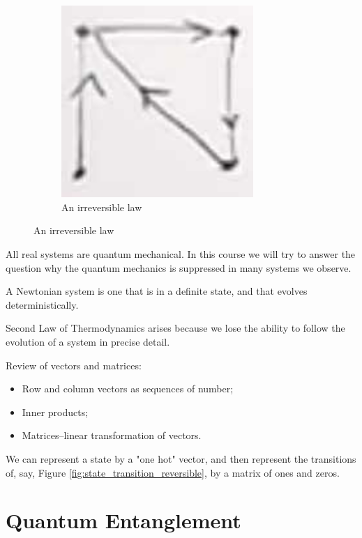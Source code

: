 \documentclass[]{article}
\begin{document}
\begin{figure}[H]
\begin{subfigure}[t]{0.45\textwidth}
	\end{subfigure}
	\begin{subfigure}[t]{0.45\textwidth}
		\caption{An irreversible law}
		\includegraphics[width=0.8\textwidth]{et-1-2}
	\end{subfigure}
\end{figure}

All real systems are quantum mechanical. In this course we will try to answer the question why the quantum mechanics is suppressed in many systems we observe.

A Newtonian system is one that is in a definite state, and that evolves deterministically.

Second Law of Thermodynamics arises because we lose the ability to follow the evolution of a system in precise detail.

Review of vectors and matrices:
\begin{itemize}
	\item Row and column vectors as sequences of number;
	\item Inner products;
	\item Matrices--linear transformation of vectors.
\end{itemize}

We can represent a state by a "one hot" vector, and then represent the transitions of, say, Figure \ref{fig:state_transition_reversible}, by a matrix of ones and zeros.

\section{Quantum Entanglement}
\end{document}
